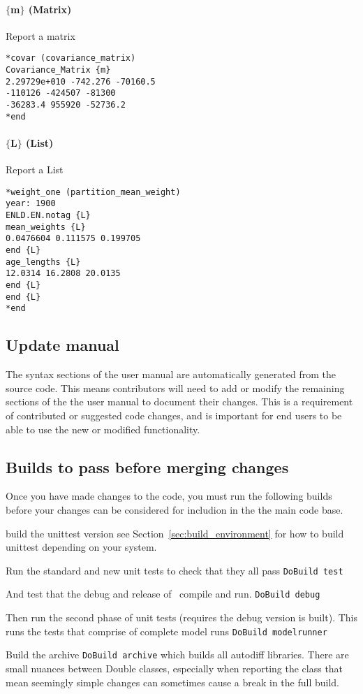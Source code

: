 \paragraph*{$\{$m$\}$ (Matrix)}
Report a matrix
{\small{\begin{verbatim}
*covar (covariance_matrix)
Covariance_Matrix {m}
2.29729e+010 -742.276 -70160.5
-110126 -424507 -81300 
-36283.4 955920 -52736.2 
*end
\end{verbatim}}}

\paragraph*{$\{$L$\}$ (List)}
Report a List
{\small{\begin{verbatim}
*weight_one (partition_mean_weight)
year: 1900
ENLD.EN.notag {L}
mean_weights {L}
0.0476604 0.111575 0.199705
end {L}
age_lengths {L}
12.0314 16.2808 20.0135
end {L}
end {L}
*end
\end{verbatim}}}

\subsection{Update manual}
The syntax sections of the user manual are automatically generated from the source code. This means contributors will need to add or modify the remaining sections of the the user manual to document their changes. This is a requirement of contributed or suggested code changes, and is important for end users to be able to use the new or modified functionality.

\subsection{Builds to pass before merging changes}

Once you have made changes to the code, you must run the following builds before your changes can be considered for includion in the the main code base.

build the unittest version see Section~\ref{sec:build_environment} for how to build unittest depending on your system.

Run the standard and new unit tests to check that they all pass
\texttt{DoBuild test}

And test that the debug and release of \CNAME\ compile and run.
\texttt{DoBuild debug}

Then run the second phase of unit tests (requires the debug version is built). This runs the tests that comprise of complete model runs
\texttt{DoBuild modelrunner}

Build the archive 
\texttt{DoBuild archive} which builds all autodiff libraries. There are small nuances between Double classes, especially when reporting the class that mean seemingly simple changes can sometimes cause a break in the full build.


